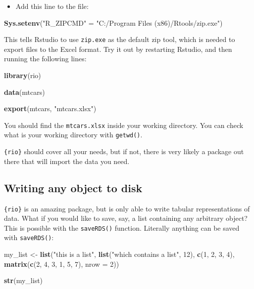 \documentclass[
]{article}
\newenvironment{Shaded}{\begin{snugshade}}{\end{snugshade}}
\newcommand{\DataTypeTok}[1]{\textcolor[rgb]{0.13,0.29,0.53}{#1}}
\newcommand{\DecValTok}[1]{\textcolor[rgb]{0.00,0.00,0.81}{#1}}
\newcommand{\KeywordTok}[1]{\textcolor[rgb]{0.13,0.29,0.53}{\textbf{#1}}}
\newcommand{\NormalTok}[1]{#1}
\newcommand{\StringTok}[1]{\textcolor[rgb]{0.31,0.60,0.02}{#1}}
\providecommand{\tightlist}{%
  \setlength{\itemsep}{0pt}\setlength{\parskip}{0pt}}
\begin{document}
\begin{itemize}
\tightlist
\item
  Add this line to the file:
\end{itemize}

\begin{Shaded}
\begin{Highlighting}[]
\KeywordTok{Sys.setenv}\NormalTok{(}\StringTok{"R\_ZIPCMD"}\NormalTok{ =}\StringTok{ "C:/Program Files (x86)/Rtools/zip.exe"}\NormalTok{)}
\end{Highlighting}
\end{Shaded}

This tells Rstudio to use \texttt{zip.exe} as the default zip tool, which is needed to export files to the
Excel format. Try it out by restarting Rstudio, and then running the following lines:

\begin{Shaded}
\begin{Highlighting}[]
\KeywordTok{library}\NormalTok{(rio)}

\KeywordTok{data}\NormalTok{(mtcars)}

\KeywordTok{export}\NormalTok{(mtcars, }\StringTok{"mtcars.xlsx"}\NormalTok{)}
\end{Highlighting}
\end{Shaded}

You should find the \texttt{mtcars.xlsx} inside your working directory. You can check what is your working
directory with \texttt{getwd()}.

\texttt{\{rio\}} should cover all your needs, but if not, there is very likely a package out there that will
import the data you need.

\hypertarget{writing-any-object-to-disk}{%
\subsection{Writing any object to disk}\label{writing-any-object-to-disk}}

\texttt{\{rio\}} is an amazing package, but is only able to write tabular representations of data. What if you
would like to save, say, a list containing any arbitrary object? This is possible with the
\texttt{saveRDS()} function. Literally anything can be saved with \texttt{saveRDS()}:

\begin{Shaded}
\begin{Highlighting}[]
\NormalTok{my\_list \textless{}{-}}\StringTok{ }\KeywordTok{list}\NormalTok{(}\StringTok{"this is a list"}\NormalTok{, }\KeywordTok{list}\NormalTok{(}\StringTok{"which contains a list"}\NormalTok{, }\DecValTok{12}\NormalTok{), }\KeywordTok{c}\NormalTok{(}\DecValTok{1}\NormalTok{, }\DecValTok{2}\NormalTok{, }\DecValTok{3}\NormalTok{, }\DecValTok{4}\NormalTok{), }\KeywordTok{matrix}\NormalTok{(}\KeywordTok{c}\NormalTok{(}\DecValTok{2}\NormalTok{, }\DecValTok{4}\NormalTok{,}
\DecValTok{3}\NormalTok{, }\DecValTok{1}\NormalTok{, }\DecValTok{5}\NormalTok{, }\DecValTok{7}\NormalTok{), }\DataTypeTok{nrow =} \DecValTok{2}\NormalTok{))}

\KeywordTok{str}\NormalTok{(my\_list)}
\end{Highlighting}
\end{Shaded}
\end{document}
